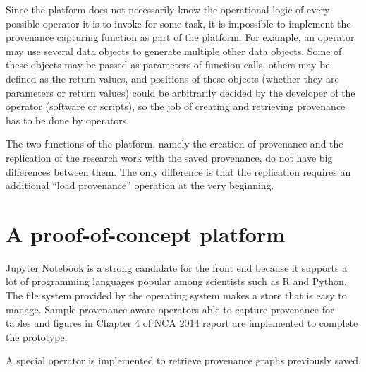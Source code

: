 Since the platform does not necessarily know the operational logic of every possible operator it is to invoke for some task, it is impossible to implement the provenance capturing function as part of the platform. For example, an operator may use several data objects to generate multiple other data objects. Some of these objects may be passed as parameters of function calls, others may be defined as the return values, and positions of these objects (whether they are parameters or return values) could be arbitrarily decided by the developer of the operator (software or scripts), so the job of creating and retrieving provenance has to be done by operators.

The two functions of the platform, namely the creation of provenance and the replication of the research work with the saved provenance, do not have big differences between them. The only difference is that the replication requires an additional ``load provenance'' operation at the very beginning.





\section{A proof-of-concept platform}
Jupyter Notebook is a strong candidate for the front end because it supports a lot of programming languages popular among scientists such as R and Python.
The file system provided by the operating system makes a store that is easy to manage.
Sample provenance aware operators able to capture provenance for tables and figures in Chapter 4 of NCA 2014 report are implemented to complete the prototype.

A special operator is implemented to retrieve provenance graphs previously saved. 

